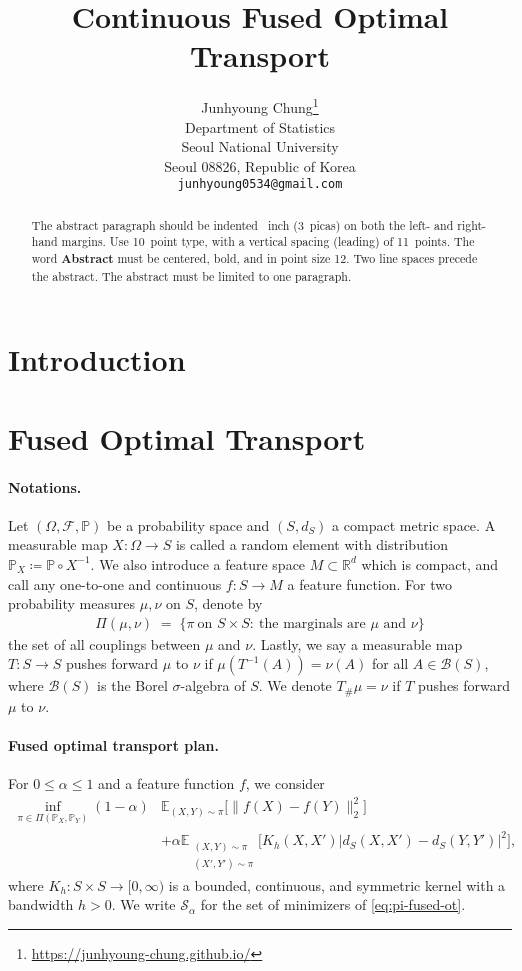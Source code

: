 \documentclass{article}
\title{Continuous Fused Optimal Transport}
\author{%
  Junhyoung Chung\thanks{\href{https://junhyoung-chung.github.io/}{https://junhyoung-chung.github.io/}} \\
  Department of Statistics\\
  Seoul National University\\
  Seoul 08826, Republic of Korea \\
  \texttt{junhyoung0534@gmail.com} \\
}
\begin{document}
\maketitle


\begin{abstract}
  The abstract paragraph should be indented ~inch (3~picas) on
  both the left- and right-hand margins. Use 10~point type, with a vertical
  spacing (leading) of 11~points.  The word \textbf{Abstract} must be centered,
  bold, and in point size 12. Two line spaces precede the abstract. The abstract
  must be limited to one paragraph.
\end{abstract}


\section{Introduction}

\section{Fused Optimal Transport}

\paragraph{Notations.}
Let $(\Omega,\mathcal{F},\mathbb{P})$ be a probability space and $(S,d_S)$ a compact metric space. 
A measurable map $X:\Omega\to S$ is called a random element with distribution $\mathbb{P}_X\coloneqq\mathbb{P}\circ X^{-1}$.
We also introduce a feature space $M\subset\mathbb{R}^d$ which is compact, and call any one-to-one and continuous $f:S\to M$ a feature function.
For two probability measures $\mu,\nu$ on $S$, denote by
\begin{align*}
\Pi(\mu,\nu)\;=\;\{\pi\ \text{on }S\times S:\ \text{the marginals are }\mu\text{ and }\nu\}
\end{align*}
the set of all couplings between $\mu$ and $\nu$. Lastly, we say a measurable map $T: S \to S$ pushes forward $\mu$ to $\nu$ if $\mu(T^{-1}(A)) = \nu(A)$ for all $A \in \mathcal{B}(S)$, where $\mathcal{B}(S)$ is the Borel $\sigma$-algebra of $S$. We denote $T_{\#}\mu = \nu$ if $T$ pushes forward $\mu$ to $\nu$.

\paragraph{Fused optimal transport plan.}
For $0\le \alpha\le 1$ and a feature function $f$, we consider
\begin{align}
	\label{eq:pi-fused-ot}
	\inf_{\pi\in\Pi(\mathbb{P}_X,\mathbb{P}_Y)} 
	(1-\alpha)&\mathbb{E}_{(X,Y)\sim\pi}\big[\|f(X)-f(Y)\|_2^2\big] \nonumber\\
	&+ \alpha\mathbb{E}_{\substack{(X,Y)\sim\pi\\(X',Y')\sim\pi}}
	\Big[K_h(X,X') \big|d_S(X,X')-d_S(Y,Y')\big|^2\Big],
\end{align}
where $K_h:S\times S\to[0,\infty)$ is a bounded, continuous, and symmetric kernel with a bandwidth $h > 0$. We write $\mathcal{S}_\alpha$ for the set of minimizers of \eqref{eq:pi-fused-ot}.
\end{document}
